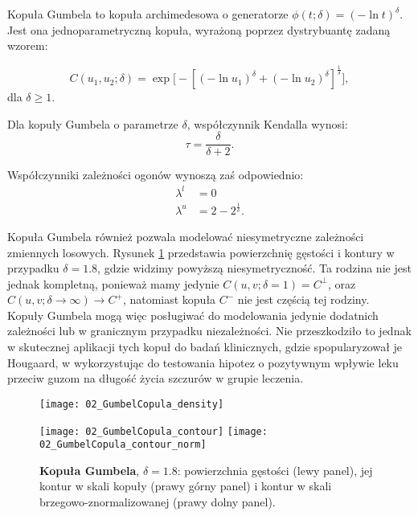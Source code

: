 \begin{df}
	Kopuła Gumbela to kopuła archimedesowa o generatorze $\phi(t;\delta) = (-\ln t)^{\delta}$. Jest ona jednoparametryczną kopuła, wyrażoną poprzez dystrybuantę zadaną wzorem:
	
	$$ C(u_1, u_2; \delta) = \exp\big[-[(-\ln u_1)^\delta+(-\ln u_2)^\delta]^{\frac{1}{\delta}}\big],$$
	dla $\delta \geqslant 1.$
\end{df}
\begin{prop}
	Dla kopuły Gumbela o parametrze $\delta$, współczynnik Kendalla wynosi:
	$$ \tau = \frac{\delta}{\delta + 2}.$$
	
	Współczynniki zależności ogonów wynoszą zaś odpowiednio:
	\begin{equation}
		\begin{split}
			\lambda^{l}&=0\\
			\lambda^{u}&=2 - 2^{\frac{1}{\delta}}.
		\end{split}
	\end{equation}
\end{prop}
Kopuła Gumbela również pozwala modelować niesymetryczne zależności zmiennych losowych.  Rysunek \ref{fig:gumbel_copula_density} przedstawia powierzchnię gęstości i kontury w przypadku $\delta = 1.8$, gdzie widzimy powyższą niesymetryczność. Ta rodzina nie jest jednak kompletną, ponieważ mamy jedynie $C(u,v;\delta = 1) = C^{\perp}$, oraz $C(u,v;\delta \to \infty) \to C^{+}$, natomiast kopuła $C^{-}$ nie jest częścią tej rodziny. \\
Kopuły Gumbela mogą więc posługiwać do modelowania jedynie dodatnich zależności lub w granicznym przypadku niezależności. Nie przeszkodziło to jednak w skutecznej aplikacji tych kopuł do badań klinicznych, gdzie spopularyzował je Hougaard, w \cite{Hougaard1986} wykorzystując do testowania hipotez o pozytywnym wpływie leku przeciw guzom na długość życia szczurów w grupie leczenia.

\begin{figure}[h]
	\centering
	\begin{minipage}{0.5\linewidth}
		\texttt{[image: 02\_GumbelCopula\_density]}
	\end{minipage}
	\begin{minipage}{0.45\linewidth}
		\texttt{[image: 02\_GumbelCopula\_contour]}
		\texttt{[image: 02\_GumbelCopula\_contour\_norm]}
	\end{minipage}
	\caption{\textbf{Kopuła Gumbela}, $\delta = 1.8$: powierzchnia gęstości (lewy panel), jej kontur w skali kopuły (prawy górny panel) i kontur w skali brzegowo-znormalizowanej (prawy dolny panel). \label{fig:gumbel_copula_density}}
\end{figure}

